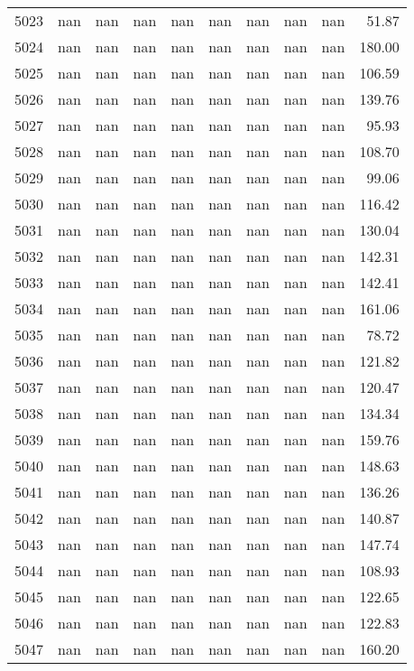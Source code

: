 \begin{tabular}{lrrrrrrrrr}
5023 & nan & nan & nan & nan & nan & nan & nan & nan & 51.87 \\
5024 & nan & nan & nan & nan & nan & nan & nan & nan & 180.00 \\
5025 & nan & nan & nan & nan & nan & nan & nan & nan & 106.59 \\
5026 & nan & nan & nan & nan & nan & nan & nan & nan & 139.76 \\
5027 & nan & nan & nan & nan & nan & nan & nan & nan & 95.93 \\
5028 & nan & nan & nan & nan & nan & nan & nan & nan & 108.70 \\
5029 & nan & nan & nan & nan & nan & nan & nan & nan & 99.06 \\
5030 & nan & nan & nan & nan & nan & nan & nan & nan & 116.42 \\
5031 & nan & nan & nan & nan & nan & nan & nan & nan & 130.04 \\
5032 & nan & nan & nan & nan & nan & nan & nan & nan & 142.31 \\
5033 & nan & nan & nan & nan & nan & nan & nan & nan & 142.41 \\
5034 & nan & nan & nan & nan & nan & nan & nan & nan & 161.06 \\
5035 & nan & nan & nan & nan & nan & nan & nan & nan & 78.72 \\
5036 & nan & nan & nan & nan & nan & nan & nan & nan & 121.82 \\
5037 & nan & nan & nan & nan & nan & nan & nan & nan & 120.47 \\
5038 & nan & nan & nan & nan & nan & nan & nan & nan & 134.34 \\
5039 & nan & nan & nan & nan & nan & nan & nan & nan & 159.76 \\
5040 & nan & nan & nan & nan & nan & nan & nan & nan & 148.63 \\
5041 & nan & nan & nan & nan & nan & nan & nan & nan & 136.26 \\
5042 & nan & nan & nan & nan & nan & nan & nan & nan & 140.87 \\
5043 & nan & nan & nan & nan & nan & nan & nan & nan & 147.74 \\
5044 & nan & nan & nan & nan & nan & nan & nan & nan & 108.93 \\
5045 & nan & nan & nan & nan & nan & nan & nan & nan & 122.65 \\
5046 & nan & nan & nan & nan & nan & nan & nan & nan & 122.83 \\
5047 & nan & nan & nan & nan & nan & nan & nan & nan & 160.20 \\

\end{tabular}
